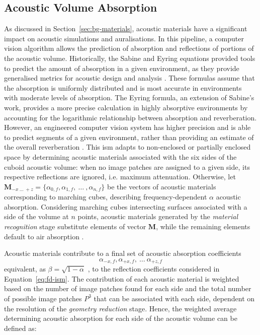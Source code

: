 \subsection{Acoustic Volume Absorption}
As discussed in Section~\ref{sec:bg-materials}, acoustic materials have a significant impact on acoustic simulations and auralisations. In this pipeline, a computer vision algorithm allows the prediction of absorption and reflections of portions of the acoustic volume. Historically, the Sabine and Eyring equations provided tools to predict the amount of absorption in a given environment, as they provide generalised metrics for acoustic design and analysis \citep{beranek2006analysis}. These formulas assume that the absorption is uniformly distributed and is most accurate in environments with moderate levels of absorption. The Eyring formula, an extension of Sabine's work, provides a more precise calculation in highly absorptive environments by accounting for the logarithmic relationship between absorption and reverberation. However, an engineered computer vision system has higher precision and is able to predict segments of a given environment, rather than providing an estimate of the overall reverberation \citep{schissler2017acoustic}.
This \acrshort{ism} adapts to non-enclosed or partially enclosed space by determining acoustic materials associated with the six sides of the cuboid acoustic volume: when no image patches are assigned to a given side, its respective reflections are ignored, i.e. maximum attenuation. Otherwise, let $\mathbf{M}_{-x~\dots~+z} = \{ \alpha_{0, f}, \alpha_{1, f},~\dots~, \alpha_{n, f} \}$ be the vectors of acoustic materials corresponding to marching cubes, describing frequency-dependent $\alpha$ acoustic absorption. Considering marching cubes intersecting surfaces associated with a side of the volume at $n$ points, acoustic materials generated by the \emph{material recognition} stage substitute elements of vector $\mathbf{M}$, while the remaining elements default to air absorption \citep{kates2020adding}.\par
Acoustic materials contribute to a final set of acoustic absorption coefficients 
\begin{equation}
    \alpha_{-x,f}, \alpha_{+x,f},~\dots~\alpha_{+z,f}
\end{equation}
equivalent, as $\beta = \sqrt{1 - \alpha}$ \citep{allen1979image}, to the reflection coefficients considered in Equation~\ref{eq:fd-ism}. The contribution of each acoustic material is weighted based on the number of image patches found for each side and the total number of possible image patches $P^3$ that can be associated with each side, dependent on the resolution of the \emph{geometry reduction} stage. Hence, the weighted average determining acoustic absorption for each side of the acoustic volume can be defined as: 
